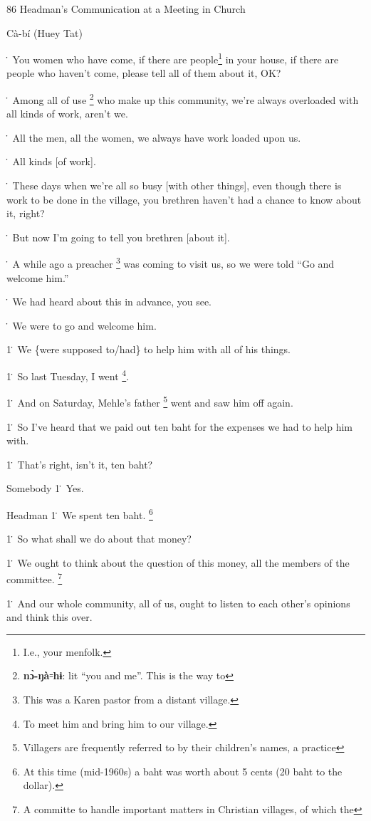 
86 Headman's Communication at a Meeting in Church

Cà-bí (Huey Tat)

\. You women who have come, if there are people\footnote{I.e., your menfolk.} in your house, if there are
people who haven't come, please tell all of them about it, OK?

\. Among all of use \footnote{\textbf{nɔ̀-ŋà}꞊\textbf{hɨ}: lit ``you and me''. This is the way to} who make up this community, we're always overloaded with
all kinds of work, aren't we.

\. All the men, all the women, we always have work loaded upon us.

\. All kinds [of work].

\. These days when we're all so busy [with other things], even though there is
work to be done in the village, you brethren haven't had a chance to know about
it, right?

\. But now I'm going to tell you brethren [about it].

\. A while ago a preacher \footnote{This was a Karen pastor from a distant village.} was coming to visit us, so we were told ``Go and
welcome him.''

\. We had heard about this in advance, you see.

\. We were to go and welcome him.

1\. We \{were supposed to/had\} to help him with all of his things.

1\. So last Tuesday, I went \footnote{To meet him and bring him to our village.}.

1\. And on Saturday, Mehle's father \footnote{Villagers are frequently referred to by their children's names, a practice} went and saw him off again.

1\. So I've heard that we paid out ten baht for the expenses we had to help him
with.

1\. That's right, isn't it, ten baht?

Somebody 1\. Yes.

Headman 1\. We spent ten baht. \footnote{At this time (mid-1960s) a baht was worth about 5 cents (20 baht to the dollar).}

1\. So what shall we do about that money?

1\. We ought to think about the question of this money, all the members of the
committee. \footnote{A committe to handle important matters in Christian villages, of which the}

1\. And our whole community, all of us, ought to listen to each other's opinions
and think this over.

